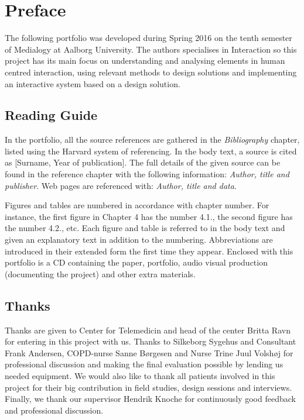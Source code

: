 \chapter{Preface}

The following portfolio was developed during Spring 2016 on the tenth semester of Medialogy at Aalborg University. The authors specialises in Interaction so this project has its main focus on understanding and analysing elements in human centred interaction, using relevant methods to design solutions and implementing an interactive system based on a design solution. 

\section*{Reading Guide}
In the portfolio, all the source references are gathered in the \textit{Bibliography} chapter, listed using the Harvard system of referencing. In the body text, a source is cited as [Surname, Year of publication]. The full details of the given source can be found in the reference chapter with the following information: \textit{Author, title and publisher}. Web pages are referenced with: \textit{Author, title and data}.

Figures and tables are numbered in accordance with chapter number. For instance, the first figure in Chapter 4 has the number 4.1., the second figure has the number 4.2., etc. Each figure and table is referred to in the body text and given an explanatory text in addition to the numbering. Abbreviations are introduced in their extended form the first time they appear. Enclosed with this portfolio is a CD containing the paper, portfolio, audio visual production (documenting the project) and other extra materials. 

\section*{Thanks}
Thanks are given to Center for Telemedicin and head of the center Britta Ravn for entering in this project with us. Thanks to Silkeborg Sygehus and Consultant Frank Andersen, COPD-nurse Sanne B{\o}rgesen and Nurse Trine Juul Volsh{\o}j for professional discussion and making the final evaluation possible by lending us needed equipment. We would also like to thank all patients involved in this project for their big contribution in field studies, design sessions and interviews. 
Finally, we thank our supervisor Hendrik Knoche for continuously good feedback and professional discussion.